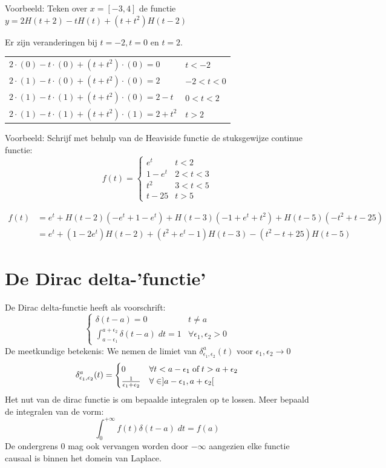 \documentclass[12pt]{report}
\newcommand{\todo}[1]{
{\color{red}\textunderscore{\textit{TODO: #1}}}
}
\newcommand{\example}[2]{
    \hrulefill
    
    Voorbeeld: #1
    
    #2
    
    \hrulefill
}
\begin{document}
\example{Teken over $x=[-3,4]$ de functie $y = 2H(t + 2) - tH(t) + (t+t^2)H(t-2)$}
{
Er zijn veranderingen bij $t = -2, t = 0$ en $t = 2$.

    \begin{tabular}{l | l}
    $2\cdot(0) - t\cdot(0) + (t+t^2)\cdot(0) = 0$ & $t < -2$\\
    $2\cdot(1) - t\cdot(0) + (t+t^2)\cdot(0) = 2$ & $-2 < t < 0$  \\
    $2\cdot(1) - t\cdot(1) + (t+t^2)\cdot(0) = 2 - t$ & $0 < t < 2$\\
    $2\cdot(1) - t\cdot(1) + (t+t^2)\cdot(1) = 2 + t^2$ & $t > 2$\\
    \end{tabular}
\todo{graph}
}
\example{Schrijf met behulp van de Heaviside functie de stuksgewijze continue functie:
$$f(t) = \begin{cases}
        e^t & t < 2 \\
        1 - e^t & 2 < t < 3 \\
        t^2 & 3 < t < 5 \\
        t - 25 & t > 5
        \end{cases}
$$}{
\begin{equation*}
\begin{split}
    f(t) & = e^t + H(t-2)(-e^t + 1 - e^t) + H(t-3)(-1 + e^t + t^2) + H(t - 5)(-t^2 + t - 25) \\
    & = e^t + (1-2e^t)H(t-2) + (t^2+e^t-1)H(t-3) - (t^2-t+25)H(t-5)
\end{split}
\end{equation*}
}

\section{De Dirac delta-'functie'}
De Dirac delta-functie heeft als voorschrift:
$$
\begin{cases}
\delta(t - a) = 0 & t \neq a \\
\int_{a - \epsilon_1}^{a + \epsilon_2} \delta(t - a) \; dt = 1 & \forall \epsilon_1, \epsilon_2 > 0 
\end{cases}
$$
De meetkundige betekenis: We nemen de limiet van $\delta^a_{\epsilon_1,\epsilon_2}(t)$ voor $\epsilon_1,\epsilon_2 \rightarrow 0$
$$\delta^a_{\epsilon_1,\epsilon_2}(t) = \begin{cases}
                                        0 & \forall t < a - \epsilon_1 \; \hbox{of} \; t > a + \epsilon_2 \\
                                        \frac{1}{\epsilon_1 + \epsilon_2} & \forall \in ]a - \epsilon_1, a + \epsilon_2[
                                        \end{cases}
$$
Het nut van de dirac functie is om bepaalde integralen op te lossen. Meer bepaald de integralen van de vorm:
$$\int_{0}^{+\infty} f(t) \delta(t- a)\;dt = f(a)$$
De ondergrens 0 mag ook vervangen worden door $-\infty$ aangezien elke functie causaal is binnen het domein van Laplace.
\end{document}
